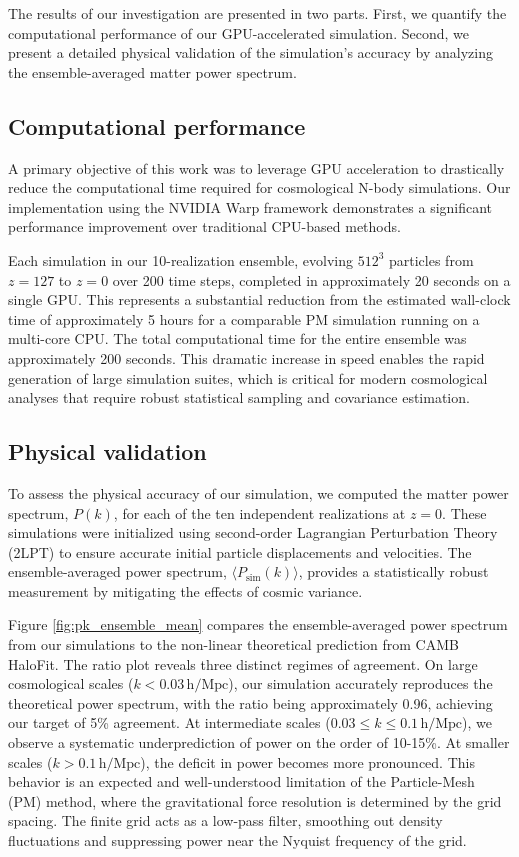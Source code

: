 \documentclass[]{article}
\begin{document}
The results of our investigation are presented in two parts. First, we quantify the computational performance of our GPU-accelerated simulation. Second, we present a detailed physical validation of the simulation's accuracy by analyzing the ensemble-averaged matter power spectrum.

\subsection{Computational performance}
A primary objective of this work was to leverage GPU acceleration to drastically reduce the computational time required for cosmological N-body simulations. Our implementation using the NVIDIA Warp framework demonstrates a significant performance improvement over traditional CPU-based methods.

Each simulation in our 10-realization ensemble, evolving $512^3$ particles from $z=127$ to $z=0$ over 200 time steps, completed in approximately 20 seconds on a single GPU. This represents a substantial reduction from the estimated wall-clock time of approximately 5 hours for a comparable PM simulation running on a multi-core CPU. The total computational time for the entire ensemble was approximately 200 seconds. This dramatic increase in speed enables the rapid generation of large simulation suites, which is critical for modern cosmological analyses that require robust statistical sampling and covariance estimation.

\subsection{Physical validation}
To assess the physical accuracy of our simulation, we computed the matter power spectrum, $P(k)$, for each of the ten independent realizations at $z=0$. These simulations were initialized using second-order Lagrangian Perturbation Theory (2LPT) to ensure accurate initial particle displacements and velocities. The ensemble-averaged power spectrum, $\langle P_{\text{sim}}(k) \rangle$, provides a statistically robust measurement by mitigating the effects of cosmic variance.

Figure \ref{fig:pk_ensemble_mean} compares the ensemble-averaged power spectrum from our simulations to the non-linear theoretical prediction from CAMB HaloFit. The ratio plot reveals three distinct regimes of agreement. On large cosmological scales ($k < 0.03 \, \text{h/Mpc}$), our simulation accurately reproduces the theoretical power spectrum, with the ratio being approximately 0.96, achieving our target of 5\% agreement. At intermediate scales ($0.03 \le k \le 0.1 \, \text{h/Mpc}$), we observe a systematic underprediction of power on the order of 10-15\%. At smaller scales ($k > 0.1 \, \text{h/Mpc}$), the deficit in power becomes more pronounced. This behavior is an expected and well-understood limitation of the Particle-Mesh (PM) method, where the gravitational force resolution is determined by the grid spacing. The finite grid acts as a low-pass filter, smoothing out density fluctuations and suppressing power near the Nyquist frequency of the grid.
\end{document}
